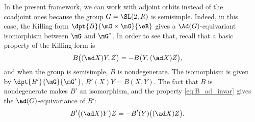 
In the present framework, we can work with adjoint orbits instead of the coadjoint ones because the group $G=\SL(2,R)$ is semisimple. Indeed, in this case, the Killing form $\dpt{B}{\mG\times\mG}{\eR}$ gives a $\Ad(G)$-equivariant isomorphism between $\mG$ and $\mG^*$. In order to see that, recall that a basic property of the Killing form is
\begin{equation}\label{eq:B_ad_invar}
   B\big( (\ad X)Y,Z \big)=-B\big(Y, (\ad X)Z \big),
\end{equation}
and when the group is semisimple, $B$ is nondegenerate. The isomorphism is given by
$\dpt{B'}{\mG}{\mG^*}$, $B'(X)Y=B(X,Y)$. The fact that $B$ is nondegenerate makes $B'$ an isomorphism, and the property \eqref{eq:B_ad_invar} gives the $\ad(G)$-equivariance of $B'$:
\[
   B'\big( (\ad X)Y \big)Z=-B'(Y)\big( (\ad X)Z\big).
\]

